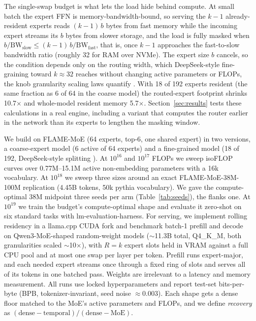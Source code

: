 \documentclass{article}
\begin{document}
The single-swap budget is what lets the load hide behind compute. At small batch the expert FFN is
memory-bandwidth-bound, so serving the $k-1$ already-resident experts reads $(k-1)\,b$ bytes from
fast memory while the incoming expert streams its $b$ bytes from slower storage, and the load is
fully masked when $b/\mathrm{BW}_{\mathrm{slow}}\le(k-1)\,b/\mathrm{BW}_{\mathrm{fast}}$, that
is, once $k-1$ approaches the fast-to-slow bandwidth ratio (roughly 32 for RAM over NVMe). The
expert size $b$ cancels, so the condition depends only on the routing width, which DeepSeek-style
fine-graining toward $k\!\approx\!32$ reaches without changing active parameters or FLOPs, the
knob granularity scaling laws quantify \cite{krajewski2024granularity,clark2022unified,ludziejewski2025joint}. With 18
of 192 experts resident (the same fraction as 6 of 64 in the coarse model) the routed-expert
footprint shrinks 10.7$\times$ and whole-model resident memory 5.7$\times$. Section~\ref{sec:results}
tests these calculations in a real engine, including a variant that computes the router earlier
in the network than its experts to lengthen the masking window.

We build on FLAME-MoE \cite{kang2025flame} (64 experts, top-6, one shared expert) in two versions,
a coarse-expert model (6 active of 64 experts) and a fine-grained model (18 of 192, DeepSeek-style
splitting \cite{dai2024deepseekmoe}). At $10^{16}$ and $10^{17}$ FLOPs we sweep isoFLOP curves over
0.77M--15.1M active non-embedding parameters with a 16k vocabulary. At $10^{18}$ we sweep three
sizes around an exact FLAME-MoE-38M-100M replication (4.45B tokens, 50k pythia vocabulary). We
gave the compute-optimal 38M midpoint three seeds per arm (Table~\ref{tab:seeds}), the flanks one. At
$10^{19}$ we train the budget's compute-optimal shape and evaluate it zero-shot on six standard
tasks with lm-evaluation-harness. For serving, we implement rolling residency in a llama.cpp CUDA
fork and benchmark batch-1 prefill and decode on Qwen3-MoE-shaped random-weight models ($\sim$11.3B total,
Q4\_K\_M, both granularities scaled $\sim$10$\times$), with $R=k$ expert slots held in VRAM
against a full CPU pool and at most one swap per layer per token. Prefill runs expert-major, and each
needed expert streams once through a fixed ring of slots and serves all of its tokens in one
batched pass. Weights are irrelevant to a latency and memory measurement. All runs use
locked hyperparameters and report test-set
bits-per-byte (BPB, tokenizer-invariant, seed noise $\approx$0.003). Each shape gets a dense floor
matched to the MoE's active parameters and FLOPs, and we define \emph{recovery} as
$(\text{dense}-\text{temporal})/(\text{dense}-\text{MoE})$.
\end{document}
